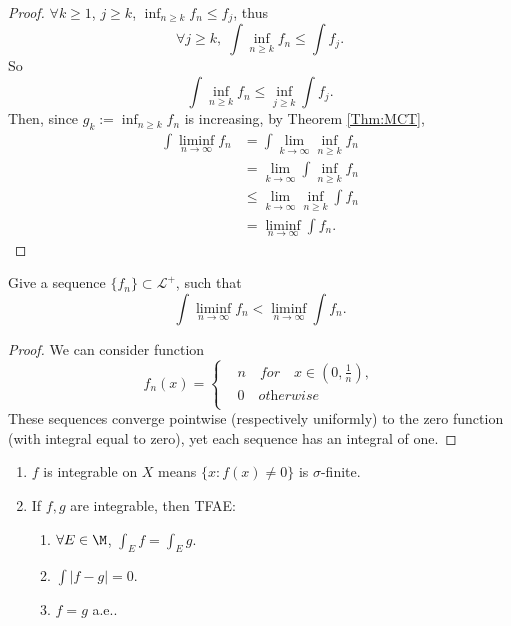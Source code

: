 \begin{proof}
    $\forall k\ge 1$, $j\ge k$, $\inf_{n\ge k}f_n\le f_{j}$, 
    thus 
    \begin{displaymath}
        \forall j\ge k,\;
        \int\inf_{n\ge k}f_n\le\int f_{j}.
    \end{displaymath} 
    So 
    \begin{displaymath}
        \int\inf_{n\ge k}f_n\le\inf_{j\ge k}\int f_{j}.
    \end{displaymath}
    Then, since $g_{k}:=\inf_{n\ge k}f_{n}$ is increasing, 
    by Theorem \ref{Thm:MCT}, 
    \begin{displaymath}
        \begin{array}{rl}
        \int\liminf_{n\rightarrow\infty}f_{n}
        &=\int\lim_{k\rightarrow\infty}\inf_{n\ge k}f_{n}\\
        &=\lim_{k\rightarrow\infty}\int\inf_{n\ge k}f_{n}\\
        &\le\lim_{k\rightarrow\infty}\inf_{n\ge k}\int f_{n}\\
        &=\liminf_{n\rightarrow\infty}\int f_{n}.
        \end{array}
    \end{displaymath}
\end{proof}
\begin{exc}
    Give a sequence $\{f_{n}\}\subset\mathcal{L}^{+}$, 
    such that 
    \begin{displaymath}
        \int\liminf_{n\rightarrow\infty}f_{n}<
        \liminf_{n\rightarrow\infty}\int f_{n}.
    \end{displaymath}
\end{exc}
\begin{proof}
    We can consider function
    \begin{displaymath}
        f_n(x)=
        \left\{\begin{array}{rl}
            &n \quad \textit{for} \quad x\in(0,\frac{1}{n}),\\
            &0 \quad \textit{otherwise}\\
        \end{array}
        \right.
    \end{displaymath}
    These sequences converge pointwise (respectively uniformly) 
    to the zero function (with integral equal to zero), 
    yet each sequence has an integral of one.
\end{proof}
\begin{prop}
    \label{Prop:PropOfL1}
    \begin{enumerate}
        \item $f$ is integrable on $X$ 
        means $\{x:f(x)\neq 0\}$ is $\sigma$-finite. 
        \item If $f,g$ are integrable, then TFAE:
        \begin{enumerate}
            \item $\forall E\in\M$, $\int_{E}f=\int_{E}g$.
            \item $\int|f-g|=0$.
            \item $f=g$ a.e..
        \end{enumerate}
    \end{enumerate}
\end{prop}
